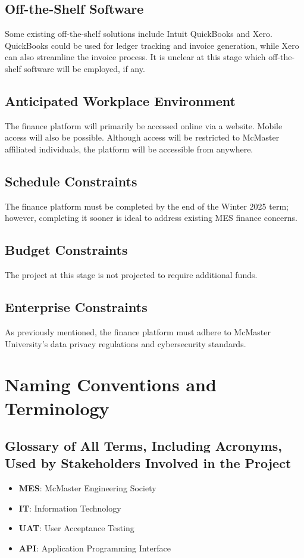 \documentclass[12pt]{article}
\begin{document}
\subsection{Off-the-Shelf Software}
Some existing off-the-shelf solutions include Intuit QuickBooks and Xero. QuickBooks could be used for ledger tracking and invoice generation, while Xero can also streamline the invoice process. It is unclear at this stage which off-the-shelf software will be employed, if any.

\subsection{Anticipated Workplace Environment}
The finance platform will primarily be accessed online via a website. Mobile access will also be possible. Although access will be restricted to McMaster affiliated individuals, the platform will be accessible from anywhere.

\subsection{Schedule Constraints}
The finance platform must be completed by the end of the Winter 2025 term; however, completing it sooner is ideal to address existing MES finance concerns.

\subsection{Budget Constraints}
The project at this stage is not projected to require additional funds.

\subsection{Enterprise Constraints}
As previously mentioned, the finance platform must adhere to McMaster University’s data privacy regulations and cybersecurity standards.


\section{Naming Conventions and Terminology}
\subsection{Glossary of All Terms, Including Acronyms, Used by Stakeholders Involved in the Project}
\begin{itemize}
    \item \textbf{MES}: McMaster Engineering Society
    \item \textbf{IT}: Information Technology
    \item \textbf{UAT}: User Acceptance Testing
    \item \textbf{API}: Application Programming Interface
\end{itemize}
\end{document}
